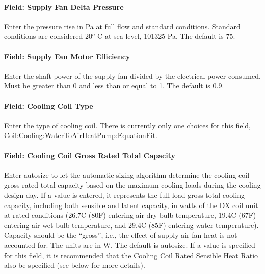 \paragraph{Field: Supply Fan Delta Pressure}\label{field-supply-fan-delta-pressure-2}

Enter the pressure rise in Pa at full flow and standard conditions. Standard conditions are considered 20\(^{o}\) C at sea level, 101325 Pa. The default is 75.

\paragraph{Field: Supply Fan Motor Efficiency}\label{field-supply-fan-motor-efficiency-3}

Enter the shaft power of the supply fan divided by the electrical power consumed. Must be greater than 0 and less than or equal to 1. The default is 0.9.

\paragraph{Field: Cooling Coil Type}\label{field-cooling-coil-type-3}

Enter the type of cooling coil. There is currently only one choices for this field, \hyperref[coilcoolingwatertoairheatpumpequationfit]{Coil:Cooling:WaterToAirHeatPump:EquationFit}.

\paragraph{Field: Cooling Coil Gross Rated Total Capacity}\label{field-cooling-coil-gross-rated-total-capacity-2}

Enter autosize to let the automatic sizing algorithm determine the cooling coil gross rated total capacity based on the maximum cooling loads during the cooling design day. If a value is entered, it represents the full load gross total cooling capacity, including both sensible and latent capacity, in watts of the DX coil unit at rated conditions (26.7C (80F) entering air dry-bulb temperature, 19.4C (67F) entering air wet-bulb temperature, and 29.4C (85F) entering water temperature). Capacity should be the ``gross'', i.e., the effect of supply air fan heat is not accounted for. The units are in W. The default is autosize. If a value is specified for this field, it is recommended that the Cooling Coil Rated Sensible Heat Ratio also be specified (see below for more details).

